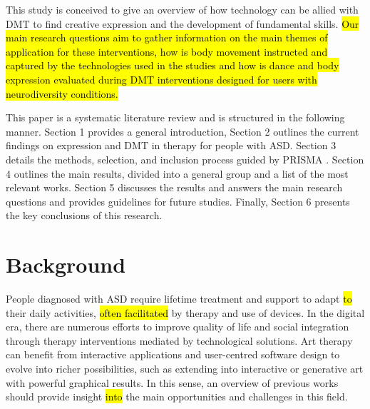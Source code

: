 \documentclass[a4paper,fleqn]{cas-sc}
\begin{document}
This study is conceived to give an overview of how technology can be allied with DMT to find creative expression and the development of fundamental skills. 
\hl{Our main research questions aim to gather information on the main themes of application for these interventions, how is  body movement instructed and captured by the technologies used in the studies and how is dance and body expression evaluated during DMT interventions designed for users with neurodiversity conditions.}

This paper is a systematic literature review and is structured in the following manner. Section 1 provides a general introduction, Section 2 outlines the current findings on expression and DMT in therapy for people with ASD. Section 3 details the methods, selection, and inclusion process guided by PRISMA \cite{Pagen71}. Section 4 outlines the main results, divided into a general group and a list of the most relevant works. Section 5 discusses the results and answers the main research questions and provides guidelines for future studies. Finally, Section 6 presents the key conclusions of this research.



\section{Background} 
\label{sec2:bg}
People diagnosed with ASD require lifetime treatment and support to adapt \hl{to} their daily activities, \hl{often facilitated} by therapy and use of devices\cite{Lord20}.
 In the digital era, there are numerous efforts to improve quality of life and social integration through therapy interventions mediated by technological solutions. Art therapy can benefit from interactive applications and user-centred software design to evolve into richer possibilities, such as extending into interactive or generative art with powerful graphical results. In this sense, an overview of previous works should provide insight \hl{into} the main opportunities and challenges in this field.
\end{document}
